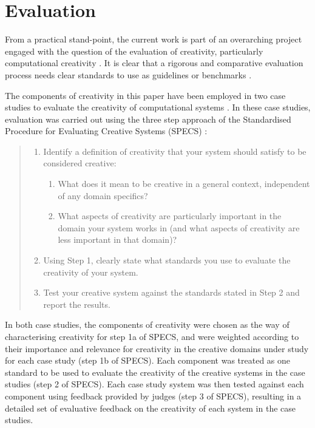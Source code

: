 \documentclass[10pt,letterpaper]{article}
\begin{document}
\section*{Evaluation}

From a practical stand-point, the current work is part of an overarching project engaged with the question of the evaluation of creativity, particularly computational creativity \cite{jordanous12cc}. It is clear that a rigorous and comparative evaluation process needs clear standards to use as guidelines or benchmarks \cite{torrance88,kaufman09}.  

The components of creativity in this paper have been employed in two case studies to evaluate the creativity of computational systems \cite{jordanousphd,jordanous12jims,jordanous16aisb}. In these case studies, evaluation was carried out using the three step approach of the Standardised Procedure for Evaluating Creative Systems (SPECS) \cite{jordanous12cc}:

\begin{quote}
\begin{enumerate}
\item Identify a definition of creativity that your system should satisfy to be considered creative:
	\begin{enumerate}
	\item What does it mean to be creative in a general context, independent of any domain specifics?
	\item What aspects of creativity are particularly important in the domain your system works in (and what aspects of creativity are less important in that domain)?
	\end{enumerate}
\item Using Step 1, clearly state what standards you use to evaluate the creativity of your system.
\item Test your creative system against the standards stated in Step 2 and report the results.
\end{enumerate}    
\end{quote}

In both case studies, the components of creativity were chosen as the way of characterising creativity for step 1a of SPECS, and were weighted according to their importance and relevance for creativity in the creative domains under study for each case study (step 1b of SPECS). Each component was treated as one standard to be used to evaluate the creativity of the creative systems in the case studies (step 2 of SPECS). Each case study system was then tested against each component using feedback provided by judges (step 3 of SPECS), resulting in a detailed set of evaluative feedback on the creativity of each system in the case studies.
\end{document}

